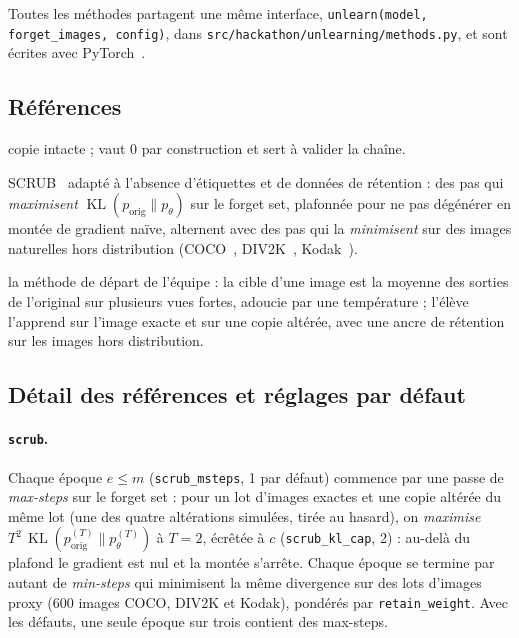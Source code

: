 \documentclass[11pt,a4paper]{article}
\newcommand{\KL}{\operatorname{KL}}
\newcommand{\orig}{\mathrm{orig}}
\newcommand{\code}[1]{\texttt{#1}}
\newcommand{\chemin}[1]{\nolinkurl{#1}}%
\begin{document}
Toutes les méthodes partagent une même interface, \code{unlearn(model, forget\_images, config)},
dans \chemin{src/hackathon/unlearning/methods.py}, et sont écrites avec PyTorch~\cite{paszke2019}.

\subsection{Références}
\begin{description}[leftmargin=1.2em,font=\sffamily\bfseries\color{bleu}]
  \item[identity] copie intacte ; vaut 0 par construction et sert à valider la chaîne.
  \item[scrub] SCRUB~\cite{kurmanji2023} adapté à l'absence d'étiquettes et de données de
    rétention : des pas qui \emph{maximisent} $\KL(p_\orig\|p_\theta)$ sur le forget set, plafonnée
    pour ne pas dégénérer en montée de gradient naïve, alternent avec des pas qui la
    \emph{minimisent} sur des images naturelles hors distribution
    (COCO~\cite{lin2014coco}, DIV2K~\cite{agustsson2017}, Kodak~\cite{kodak}).
  \item[gold\_soft] la méthode de départ de l'équipe : la cible d'une image est la moyenne des
    sorties de l'original sur plusieurs vues fortes, adoucie par une température ; l'élève
    l'apprend sur l'image exacte et sur une copie altérée, avec une ancre de rétention sur les
    images hors distribution.
\end{description}

\subsection{Détail des références et réglages par défaut}\label{sec:refsdetail}
\paragraph{\code{scrub}.} Chaque époque $e\le m$ (\code{scrub\_msteps}, 1 par défaut) commence par
une passe de \emph{max-steps} sur le forget set : pour un lot d'images exactes et une copie altérée
du même lot (une des quatre altérations simulées, tirée au hasard), on \emph{maximise}
$T^2\,\KL(p^{(T)}_\orig\|p^{(T)}_\theta)$ à $T=2$, écrêtée à $c$ (\code{scrub\_kl\_cap}, 2) : au-delà
du plafond le gradient est nul et la montée s'arrête. Chaque époque se termine par autant de
\emph{min-steps} qui minimisent la même divergence sur des lots d'images proxy (600 images COCO,
DIV2K et Kodak), pondérés par \code{retain\_weight}. Avec les défauts, une seule époque sur trois
contient des max-steps.
\end{document}

